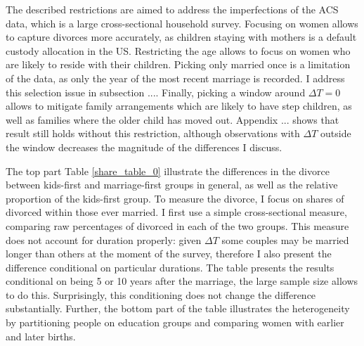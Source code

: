 \documentclass[12pt,letter]{article}
\begin{document}
The described restrictions are aimed to address the imperfections of the ACS data, which is a large cross-sectional household survey. Focusing on women allows to capture divorces more accurately, as children staying with mothers is a default custody allocation in the US. Restricting the age allows to focus on women who are likely to reside with their children. Picking only married once is a limitation of the data, as only the year of the most recent marriage is recorded. I address this selection issue in subsection .... Finally, picking a window around $\Delta T = 0$ allows to mitigate family arrangements which are likely to have step children, as well as families where the older child has moved out. Appendix ... shows that result still holds without this restriction, although observations with $\Delta T$ outside the window decreases the magnitude of the differences I discuss.



The top part Table \ref{share_table_0} illustrate the differences in the divorce between kids-first and marriage-first groups in general, as well as the relative proportion of the kids-first group. To measure the divorce, I focus on shares of divorced within those ever married. I first use a simple cross-sectional measure, comparing raw percentages of divorced in each of the two groups. This measure does not account for duration properly: given $\Delta T$ some couples may be married longer than others at the moment of the survey, therefore I also present the difference conditional on particular durations. The table presents the results conditional on being 5 or 10  years after the marriage, the large sample size allows to do this. Surprisingly, this conditioning does not change the difference substantially. Further, the bottom part of the table illustrates the heterogeneity by partitioning people on education groups and comparing women with earlier and later births.  
\end{document}
